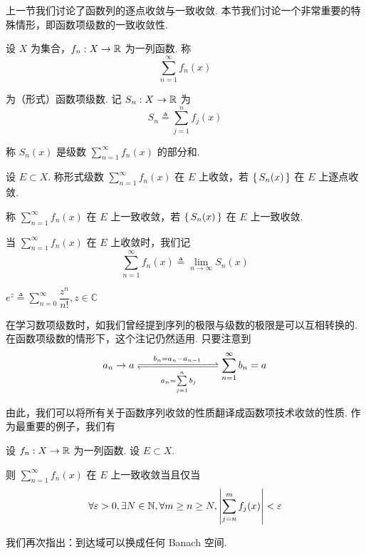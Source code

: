 上一节我们讨论了函数列的逐点收敛与一致收敛. 本节我们讨论一个非常重要的特殊情形，即函数项级数的一致收敛性.


\begin{definition}
    设 $X$ 为集合，$f_n:X\to\mathbb{R}$ 为一列函数. 称
$$
\sum_{n=1}^\infty f_n(x)
$$

    为（形式）函数项级数. 记 $S_n:X\to\mathbb{R}$ 为
$$
S_n\triangleq\sum_{j=1}^nf_j(x)
$$

    称 $S_n(x)$ 是级数 $\sum\limits_{n=1}^\infty f_n(x)$ 的部分和.
\end{definition}

\begin{definition}
    设 $E\subset X$. 称形式级数 $\sum\limits_{n=1}^\infty f_n(x)$ 在 $E$ 上收敛，若 $\set{S_n(x)}$ 在 $E$ 上逐点收敛.

    称 $\sum\limits_{n=1}^\infty f_n(x)$ 在 $E$ 上一致收敛，若 $\set{S_n(x)}$ 在 $E$ 上一致收敛.

    当 $\sum\limits_{n=1}^\infty f_n(x)$ 在 $E$ 上收敛时，我们记
$$
\sum_{n=1}^\infty f_n(x)\triangleq\lim_{n\to\infty}S_n(x)
$$
\end{definition}

\begin{example}
    $e^z\triangleq\sum\limits_{n=0}^\infty\dfrac{z^n}{n!},z\in\mathbb{C}$
\end{example}

\begin{hint}
    在学习数项级数时，如我们曾经提到序列的极限与级数的极限是可以互相转换的. 在函数项级数的情形下，这个注记仍然适用. 只要注意到
$$
a_n\to a\xrightleftharpoons[\qquad a_n=\sum\limits_{j=1}^nb_j\qquad]{b_n=a_n-a_{n-1}}\sum_{n=1}^\infty b_n=a
$$

    由此，我们可以将所有关于函数序列收敛的性质翻译成函数项技术收敛的性质. 作为最重要的例子，我们有
\end{hint}

\begin{property}[Cauchy]
    设 $f_n:X\to\mathbb{R}$ 为一列函数. 设 $E\subset X$.

    则 $\sum\limits_{n=1}^\infty f_n(x)$ 在 $E$ 上一致收敛当且仅当
$$
\forall\varepsilon>0,\exists N\in\mathbb{N},\forall m\ge n\ge N,\left\lvert{\sum_{j=n}^mf_j(x)}\right\rvert<\varepsilon
$$
\end{property}

\begin{hint}
    我们再次指出：到达域可以换成任何 Banach 空间.
\end{hint}

